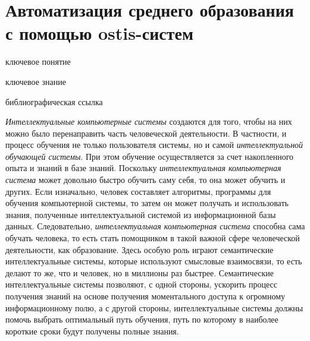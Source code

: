 \section{Автоматизация среднего образования с помощью ostis-систем}
\label{sec_automation_secondary_education}

\begin{SCn}
	
	\bigskip
	
	\begin{scnrelfromlist}{ключевое понятие}
	\end{scnrelfromlist}
	
	\bigskip
	
	\begin{scnrelfromlist}{ключевое знание}
	\end{scnrelfromlist}
	
	\bigskip
	
	\begin{scnrelfromlist}{библиографическая ссылка}
	\end{scnrelfromlist}
	
\end{SCn}

\textit{Интеллектуальные компьютерные системы} создаются для того, чтобы на них можно было перенаправить часть человеческой деятельности. В частности, и процесс обучения не только пользователя системы, но и самой \textit{интеллектуальной обучающей системы}. При этом обучение осуществляется за счет накопленного опыта и знаний в базе знаний. Поскольку \textit{интеллектуальная компьютерная система} может довольно быстро обучить саму себя, то она может обучить и других. Если изначально, человек составляет алгоритмы, программы для обучения компьютерной системы, то затем он может получать и использовать знания, полученные интеллектуальной системой из информационной базы данных. Следовательно, \textit{интеллектуальная компьютерная система} способна сама обучать человека, то есть стать помощником в такой важной сфере человеческой деятельности, как образование. Здесь особую роль играют семантические интеллектуальные системы, которые используют смысловые взаимосвязи, то есть делают то же, что и человек, но в миллионы раз быстрее. Семантические интеллектуальные системы позволяют, с одной стороны, ускорить процесс получения знаний на основе получения моментального доступа к огромному информационному полю, а с другой стороны, интеллектуальные системы должны помочь выбрать оптимальный путь обучения, путь по которому в наиболее короткие сроки будут получены полные знания.

